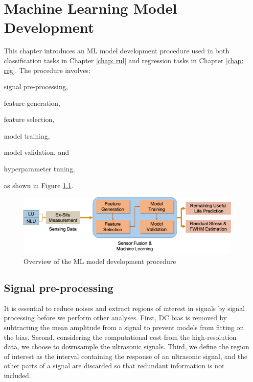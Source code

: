 \chapter{Machine Learning Model Development}
\label{chap: model}

This chapter introduces an ML model development procedure used in both classification tasks in Chapter \ref{chap: rul} and regression tasks in Chapter \ref{chap: reg}. The procedure involves:
\begin{enumerate*}[label=(\alph*)]
    \item signal pre-processing,
    \item feature generation,
    \item feature selection,
    \item model training,
    \item model validation, and
    \item hyperparameter tuning,
\end{enumerate*}
as shown in Figure \ref{fig: model development}.

\begin{figure}[tb]
    \centering
    \includegraphics[width=\linewidth]{fig/model_development.png}
    \caption{Overview of the ML model development procedure}
    \label{fig: model development}
\end{figure}

\section{Signal pre-processing}
It is essential to reduce noises and extract regions of interest in signals by signal processing before we perform other analyses. First, DC bias is removed by subtracting the mean amplitude from a signal to prevent models from fitting on the bias. Second, considering the computational cost from the high-resolution data, we choose to downsample the ultrasonic signals. Third, we define the region of interest as the interval containing the response of an ultrasonic signal, and the other parts of a signal are discarded so that redundant information is not included.

